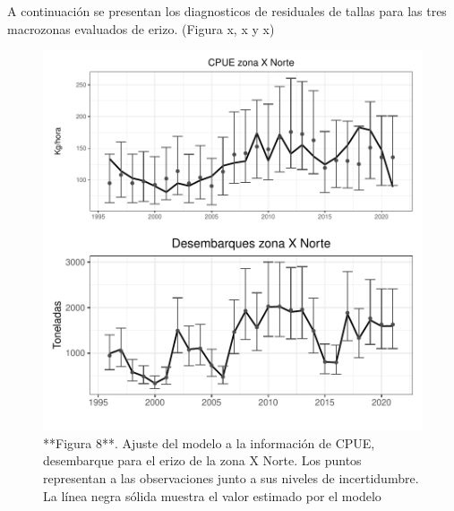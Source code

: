 \documentclass[
]{article}
\begin{document}
A continuación se presentan los diagnosticos de residuales de tallas
para las tres macrozonas evaluados de erizo. (Figura x, x y x)

\begin{figure}

{\centering \includegraphics{Figuras/Fig_ajustesIndices_XN-1} 

}

\caption{**Figura 8**. Ajuste del modelo a la información de CPUE, desembarque para el erizo de la zona X Norte. Los puntos representan a las observaciones junto a sus niveles de incertidumbre. La línea negra sólida muestra el valor estimado por el modelo}\label{fig:Fig_ajustesIndices_XN}
\end{figure}
\end{document}
